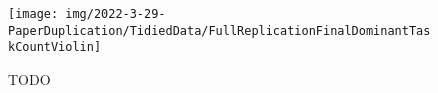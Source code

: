 \begin{figure}
    \centering
    \texttt{[image: img/2022-3-29-PaperDuplication/TidiedData/FullReplicationFinalDominantTaskCountViolin]}
    \caption{TODO} \label{fig:FullReplicationFinalDominantTaskCountViolin}
\end{figure}
